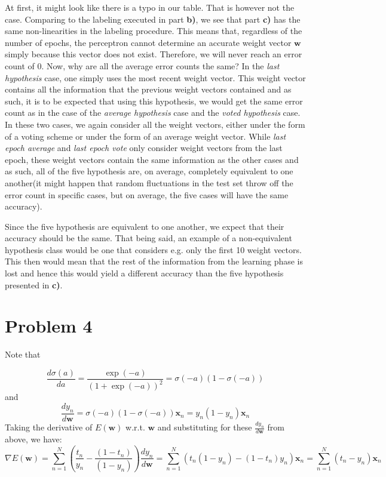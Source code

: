 \documentclass{article}
\begin{document}
At first, it might look like there is a typo in our table. That is however not the case. Comparing to the labeling executed in part \textbf{b)}, we see that part \textbf{c)} has the same non-linearities in the labeling procedure. This means that, regardless of the number of epochs, the perceptron cannot determine an accurate weight vector $\mathbf{w}$ simply because this vector does not exist. Therefore, we will never reach an error count of 0. Now, why are all the average error counts the same?
In the \textit{last hypothesis} case, one simply uses the most recent weight vector. This weight vector contains all the information that the previous weight vectors contained and as such, it is to be expected that using this hypothesis, we would get the same error count as in the case of the \textit{average hypothesis} case and the \textit{voted hypothesis} case. In these two cases, we again consider all the weight vectors, either under the form of a voting scheme or under the form of an average weight vector. While \textit{last epoch average} and \textit{last epoch vote} only consider weight vectors from the last epoch, these weight vectors contain the same information as the other cases and as such, all of the five hypothesis are, on average, completely equivalent to one another(it might happen that random fluctuations in the test set throw off the error count in specific cases, but on average, the five cases will have the same accuracy).

Since the five hypothesis are equivalent to one another, we expect that their accuracy should be the same. That being said, an example of a non-equivalent hypothesis class would be one that considers e.g. only the first 10 weight vectors. This then would mean that the rest of the information from the learning phase is lost and hence this would yield a different accuracy than the five hypothesis presented in \textbf{c)}.
\section{Problem 4}

Note that

\begin{equation*}
\frac{d \sigma(a)}{d a} = \frac{\exp(-a)}{(1+ \exp(-a))^2} = \sigma(-a) (1-\sigma(-a))
\end{equation*}
and
\begin{equation*}
\frac{d y_n}{d \mathbf{w}} = \sigma(-a) (1-\sigma(-a)) \mathbf{x}_n = y_n (1-y_n) \mathbf{x}_n
\end{equation*}
Taking the derivative of $E(\mathbf{w})$ w.r.t. $\mathbf{w}$ and substituting for these $\frac{d y_n}{d \mathbf{w}}$ from above, we have:
\begin{equation*}
\nabla E(\mathbf{w}) = \sum_{n=1}^N (\frac{t_n}{y_n}  - \frac{(1-t_n)}{(1-y_n)}) \frac{d y_n}{d \mathbf{w}} = \sum_{n=1}^N (t_n(1-y_n)-(1-t_n)y_n) \mathbf{x}_n = \sum_{n=1}^N(t_n - y_n)\mathbf{x}_n
\end{equation*} 
\end{document}
